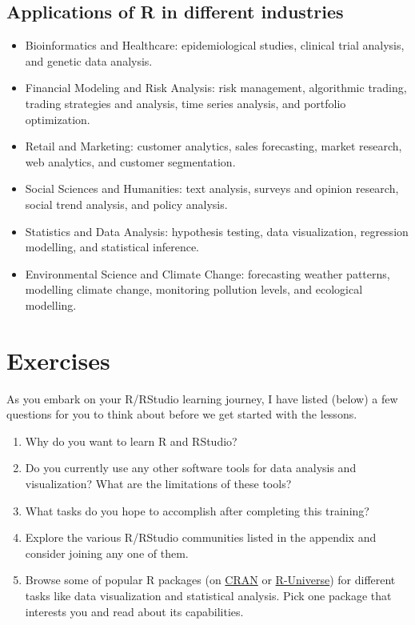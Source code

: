 \documentclass[
  letterpaper,
  DIV=11,
  numbers=noendperiod]{scrreprt}
\begin{document}
\hypertarget{applications-of-r-in-different-industries}{%
\subsection{Applications of R in different
industries}\label{applications-of-r-in-different-industries}}

\begin{itemize}
\item
  Bioinformatics and Healthcare: epidemiological studies, clinical trial
  analysis, and genetic data analysis.
\item
  Financial Modeling and Risk Analysis: risk management, algorithmic
  trading, trading strategies and analysis, time series analysis, and
  portfolio optimization.
\item
  Retail and Marketing: customer analytics, sales forecasting, market
  research, web analytics, and customer segmentation.
\item
  Social Sciences and Humanities: text analysis, surveys and opinion
  research, social trend analysis, and policy analysis.
\item
  Statistics and Data Analysis: hypothesis testing, data visualization,
  regression modelling, and statistical inference.
\item
  Environmental Science and Climate Change: forecasting weather
  patterns, modelling climate change, monitoring pollution levels, and
  ecological modelling.
\end{itemize}

\hypertarget{exercises}{%
\section{Exercises}\label{exercises}}

As you embark on your R/RStudio learning journey, I have listed (below)
a few questions for you to think about before we get started with the
lessons.

\begin{enumerate}
\def\labelenumi{\roman{enumi}.}
\item
  Why do you want to learn R and RStudio?
\item
  Do you currently use any other software tools for data analysis and
  visualization? What are the limitations of these tools?
\item
  What tasks do you hope to accomplish after completing this training?
\item
  Explore the various R/RStudio communities listed in the appendix and
  consider joining any one of them.
\item
  Browse some of popular R packages (on
  \href{https://cran.r-project.org/}{CRAN} or
  \href{https://r-universe.dev/search/}{R-Universe}) for different tasks
  like data visualization and statistical analysis. Pick one package
  that interests you and read about its capabilities.
\end{enumerate}
\end{document}
